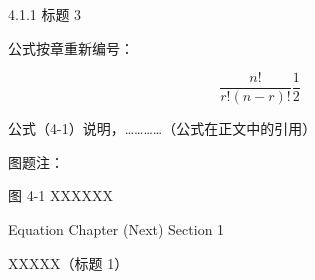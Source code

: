 \documentclass[UTF8, scheme=chinese, openany, oneside]{ctexbook}
\begin{document}

\vspace{0.3cm}
\noindent \hspace{2em} { 4.1.1 \quad 标题 3}

\vspace{1.2cm}

\noindent \hspace{2em} 公式按章重新编号：

\vspace{0.6cm}

\begin{equation}
\frac{n!}{r!(n-r)!} \frac{1}{2} \tag{4-1} \label{eq:4-1}
\end{equation}

\vspace{1.8cm}

\noindent \hspace{2em} 公式（4-1）说明，…………（公式在正文中的引用）

\vspace{3.5cm}

\noindent \hspace{2em} 图题注：

\vspace{0.8cm}

\begin{center}
 图 4-1 \quad XXXXXX
\end{center}

\newpage
{}
\vspace*{5cm}
\begin{center}
{\color{white} Equation Chapter (Next) Section 1}
\end{center}


\clearpage
\setcounter{chapter}{4} %
\setcounter{page}{12}    %


\vspace{1cm}
\begin{center}
{ \quad XXXXX（标题 1）}
\end{center}
\vspace{0.8cm}
\end{document}
